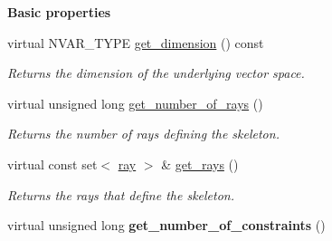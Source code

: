 \begin{Indent}\textbf{ Basic properties}\par
\begin{DoxyCompactItemize}
\item 
\mbox{\label{group___c_l_s_solvers_aa7ea7b9f4bb731fcb3b48991d33efe0a}} 
virtual N\+V\+A\+R\+\_\+\+T\+Y\+PE \hyperlink{group___c_l_s_solvers_aa7ea7b9f4bb731fcb3b48991d33efe0a}{get\+\_\+dimension} () const
\begin{DoxyCompactList}\small\item\em Returns the dimension of the underlying vector space. \end{DoxyCompactList}\item 
\mbox{\label{group___c_l_s_solvers_ae687af797043acd0e7621e75dd97b37a}} 
virtual unsigned long \hyperlink{group___c_l_s_solvers_ae687af797043acd0e7621e75dd97b37a}{get\+\_\+number\+\_\+of\+\_\+rays} ()
\begin{DoxyCompactList}\small\item\em Returns the number of rays defining the skeleton. \end{DoxyCompactList}\item 
\mbox{\label{group___c_l_s_solvers_abd6239c7b6c914ba4c30e357d9fbc59c}} 
virtual const set$<$ \hyperlink{group___c_l_s_solvers_classray}{ray} $>$ \& \hyperlink{group___c_l_s_solvers_abd6239c7b6c914ba4c30e357d9fbc59c}{get\+\_\+rays} ()
\begin{DoxyCompactList}\small\item\em Returns the rays that define the skeleton. \end{DoxyCompactList}\item 
\mbox{\label{group___c_l_s_solvers_a714f9e1e02b53d1a785297e86567b133}} 
virtual unsigned long {\bfseries get\+\_\+number\+\_\+of\+\_\+constraints} ()
\end{DoxyCompactItemize}
\end{Indent}

